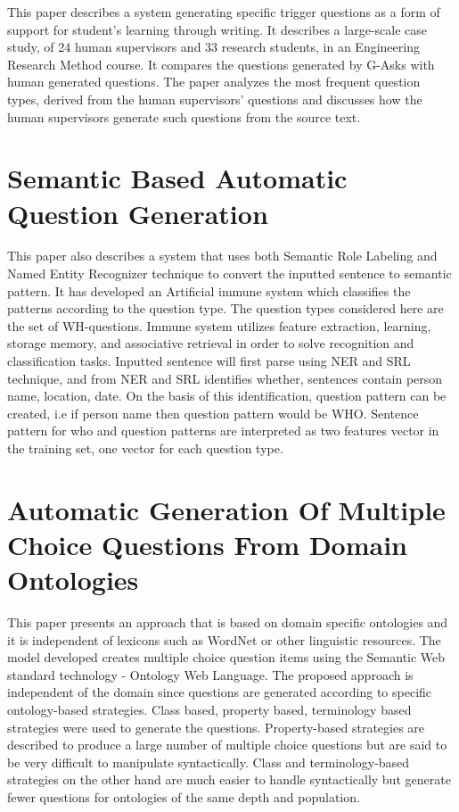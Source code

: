 This paper describes a system generating specific trigger questions as a form of
support for student’s learning through writing. It describes a large-scale case
study, of 24 human supervisors and 33 research students, in an Engineering
Research Method course. It compares the questions generated by G-Asks with human
generated questions. The paper analyzes the most frequent question types,
derived from the human supervisors’ questions and discusses how the human
supervisors generate such questions from the source text.

\section{Semantic Based Automatic Question Generation}

This paper also describes a system that uses both Semantic Role Labeling and
Named Entity Recognizer technique to convert the inputted sentence to semantic
pattern. It has developed an Artificial immune system which classifies the
patterns according to the question type. The question types considered here are
the set of WH-questions. Immune system utilizes feature extraction, learning,
storage memory, and associative retrieval in order to solve recognition and
classification tasks. Inputted sentence will first parse using NER and SRL
technique, and from NER and SRL identifies whether, sentences contain person
name, location, date. On the basis of this identification, question pattern can
be created, i.e if person name then question pattern would be WHO.  Sentence
pattern for who and question patterns are interpreted as two features vector in
the training set, one vector for each question type.

\section{Automatic Generation Of Multiple Choice Questions From Domain
Ontologies}

This paper presents an approach that is based on domain specific ontologies and
it is independent of lexicons such as WordNet or other linguistic resources. The
model developed creates multiple choice question items using the Semantic Web
standard technology - Ontology Web Language. The proposed approach is
independent of the domain since questions are generated according to specific
ontology-based strategies. Class based, property based, terminology based
strategies were used to generate the questions. Property-based strategies are
described to produce a large number of multiple choice questions but are said to
be very difficult to manipulate syntactically. Class and terminology-based
strategies on the other hand are much easier to handle syntactically but
generate fewer questions for ontologies of the same depth and population.


